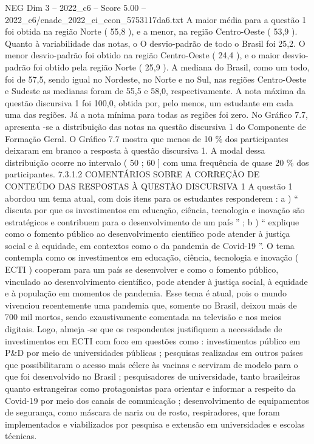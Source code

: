 \begin{textsample}{NEG Dim 3 – 2022\_c6 – Score 5.00 – 2022\_c6/enade\_2022\_ci\_econ\_5753117da6.txt}
A maior média para a questão 1 foi obtida na região Norte ( 55,8 ), e a menor, na região Centro-Oeste ( 53,9 ).
Quanto à variabilidade das notas, o O desvio-padrão de todo o Brasil foi 25,2.
O menor desvio-padrão foi obtido na região Centro-Oeste ( 24,4 ), e o maior desvio-padrão foi obtido pela região Norte ( 25,9 ).
A mediana do Brasil, como um todo, foi de 57,5, sendo igual no Nordeste, no Norte e no Sul, nas regiões Centro-Oeste e Sudeste as medianas foram de 55,5 e 58,0, respectivamente.
A nota máxima da questão discursiva 1 foi 100,0, obtida por, pelo menos, um estudante em cada uma das regiões.
Já a nota mínima para todas as regiões foi zero.
No Gráfico 7.7, apresenta -se a distribuição das notas na questão discursiva 1 do Componente de Formação Geral.
O Gráfico 7.7 mostra que menos de 10 \% dos participantes deixaram em branco a resposta à questão discursiva 1.
A modal dessa distribuição ocorre no intervalo ( 50 ; 60 ] com uma frequência de quase 20 \% dos participantes. 7.3.1.2 COMENTÁRIOS SOBRE A CORREÇÃO DE CONTEÚDO DAS RESPOSTAS À QUESTÃO DISCURSIVA 1 A questão 1 abordou um tema atual, com dois itens para os estudantes responderem : a ) “ discuta por que os investimentos em educação, ciência, tecnologia e inovação são estratégicos e contribuem para o desenvolvimento de um país ” ; b ) “ explique como o fomento público ao desenvolvimento científico pode atender à justiça social e à equidade, em contextos como o da pandemia de Covid-19 ”.
O tema contempla como os investimentos em educação, ciência, tecnologia e inovação ( ECTI ) cooperam para um país se desenvolver e como o fomento público, vinculado ao desenvolvimento científico, pode atender à justiça social, à equidade e à população em momentos de pandemia.
Esse tema é atual, pois o mundo vivenciou recentemente uma pandemia que, somente no Brasil, deixou mais de 700 mil mortos, sendo exaustivamente comentada na televisão e nos meios digitais.
Logo, almeja -se que os respondentes justifiquem a necessidade de investimentos em ECTI com foco em questões como : investimentos público em P\&D por meio de universidades públicas ; pesquisas realizadas em outros países que possibilitaram o acesso mais célere às vacinas e serviram de modelo para o que foi desenvolvido no Brasil ; pesquisadores de universidade, tanto brasileiras quanto estrangeiras como protagonistas para orientar e informar a respeito da Covid-19 por meio dos canais de comunicação ; desenvolvimento de equipamentos de segurança, como máscara de nariz ou de rosto, respiradores, que foram implementados e viabilizados por pesquisa e extensão em universidades e escolas técnicas.

\end{textsample}
